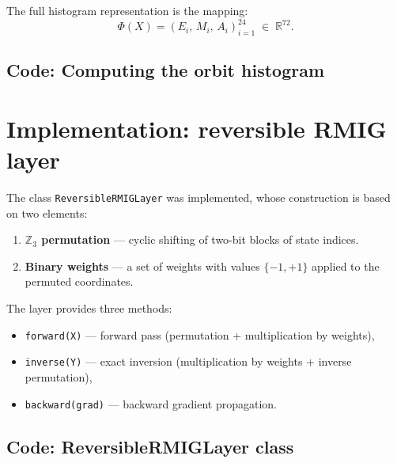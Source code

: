 \documentclass[11pt,a4paper]{report}
\begin{document}
The full histogram representation is the mapping:
\[
\Phi(X) = (E_i,\, M_i,\, A_i)_{i=1}^{24} \;\in\; \mathbb{R}^{72}.
\]

\subsection{Code: Computing the orbit histogram}

\noindent{}



\section{Implementation: reversible RMIG layer}

The class \texttt{ReversibleRMIGLayer} was implemented, whose construction is based on two elements:
\begin{enumerate}
\item \textbf{$\mathbb{Z}_3$ permutation} --- cyclic shifting of two-bit blocks of state indices.
\item \textbf{Binary weights} --- a set of weights with values $\{-1, +1\}$ applied to the permuted coordinates.
\end{enumerate}

The layer provides three methods:
\begin{itemize}
\item \texttt{forward(X)} --- forward pass (permutation + multiplication by weights),
\item \texttt{inverse(Y)} --- exact inversion (multiplication by weights + inverse permutation),
\item \texttt{backward(grad)} --- backward gradient propagation.
\end{itemize}

\subsection{Code: ReversibleRMIGLayer class}

\noindent{}
\end{document}
